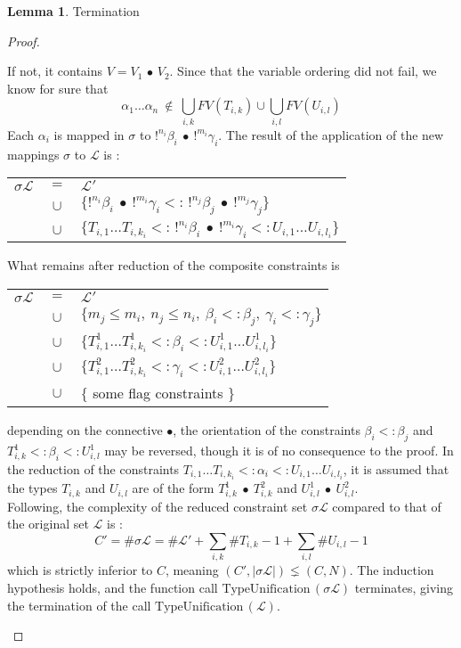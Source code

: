 \documentclass[9pt]{article}
\theoremstyle{plain}
\theoremstyle{definition}
\newtheorem{lemma}{Lemma}[section]
\begin{document}
\begin{lemma}{Termination}
\begin{proof}
\begin{itemize}
				If not, it contains $V = V_1 \,\bullet\, V_2$. Since that the variable ordering did not fail, we know for sure that
						$$\alpha_1 \dots \alpha_n ~ \notin ~ \bigcup_{i, k} FV(T_{i, k}) \cup \bigcup_{i, l} FV(U_{i, l})$$
				Each $\alpha_i$ is mapped in $\sigma$ to $!^{n_i} \beta_i ~ \bullet ~ !^{m_i}\gamma_i$.
				The result of the application of the new mappings $\sigma$ to $\mathcal{L}$ is :
			  	\begin{center}
			  	\begin{tabular}{lcl}
			  		$\sigma \mathcal{L}$ & $ = $ & $\mathcal{L'}$ \\
				  	& $ \cup $ & $\{!^{n_i} \beta_i ~ \bullet ~ !^{m_i}\gamma_i <: \,!^{n_j} \beta_j ~ \bullet ~ !^{m_j}\gamma_j \}$ \\
				  	& $ \cup $ & $\{ T_{i, 1} \dots T_{i, k_i} <: \,!^{n_i} \beta_i ~ \bullet ~ !^{m_i}\gamma_i <: U_{i, 1} \dots U_{i, l_i} \}$
				  \end{tabular}
				  \end{center}
       	What remains after reduction of the composite constraints is
					\begin{center}
			  	\begin{tabular}{lcl}
			  		$\sigma \mathcal{L}$ & $ = $ & $\mathcal{L'}$ \\
			  		& $ \cup $ & $\{m_j \le m_i, ~n_j \le n_i, ~\beta_i <: \beta_j, ~\gamma_i <: \gamma_j \}$ \\
			  		& $ \cup $ & $\{ T^1_{i, 1} \dots T^1_{i, k_i} <: \beta_i <: U^1_{i, 1} \dots U^1_{i, l_i} \}$ \\
			  		& $ \cup $ & $\{ T^2_{i, 1} \dots T^2_{i, k_i} <: \gamma_i <: U^2_{i, 1} \dots U^2_{i, l_i} \}$ \\
			  		& $ \cup $ & $\{$ some flag constraints $\}$
			  	\end{tabular}
			  	\end{center}
				depending on the connective $\bullet$, the orientation of the constraints $\beta_i <: \beta_j$ and $T^1_{i, k} <: \beta_i <: U^1_{i, l}$
			  may be reversed, though it is of no consequence to the proof.
			  In the reduction of the constraints $T_{i, 1} \dots T_{i, k_i} <: \alpha_i <: U_{i, 1} \dots U_{i, l_i}$, it is assumed that
			  the types $T_{i, k}$ and $U_{i, l}$ are of the form $T^1_{i, k} ~\bullet~ T^2_{i, k}$ and $U^1_{i, l} ~\bullet~ U^2_{i, l}$. \\
			  Following, the complexity of the reduced constraint set $\sigma \mathcal{L}$ compared to that of the original set $\mathcal{L}$ is :
			  	$$C' = \#\sigma\mathcal{L} = \#\mathcal{L'} + \sum_{i, k} \#T_{i, k} - 1 + \sum_{i, l} \#U_{i, l} - 1 $$
			  which is strictly inferior to $C$, meaning $(C',|\sigma\mathcal{L}|) \lneq (C, N)$. The induction hypothesis holds, and the function
			  call $\text{TypeUnification}\,(\sigma \mathcal{L})$ terminates, giving the termination of the call
			  $\text{TypeUnification}\,(\mathcal{L})$.
			  
		\end{itemize}
	\end{proof}
\end{lemma}
\end{document}
